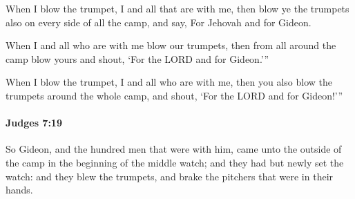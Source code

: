 			\begin{versebox}
					\item[BHS] 
					\item[ASV] When I blow the trumpet, I and all that are with me, then blow ye the trumpets also on every side of all the camp, and say, For Jehovah and for Gideon.
					\item[NIV] When I and all who are with me blow our trumpets, then from all around the camp blow yours and shout, ‘For the LORD and for Gideon.’”
					\item[NRSV] When I blow the trumpet, I and all who are with me, then you also blow the trumpets around the whole camp, and shout, ‘For the LORD and for Gideon!’”
			\end{versebox}

		\paragraph{Judges 7:19} %
			\label{JUDGES-7-19}

			So Gideon, and the hundred men that were with him, came unto the outside of the camp in the beginning of the middle watch; and they had but newly set the watch: and they blew the trumpets, and brake the pitchers that were in their hands.

